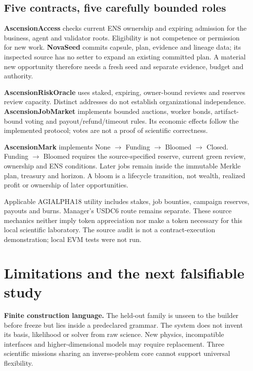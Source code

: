 \documentclass[11pt,letterpaper]{article}
\begin{document}
\subsection{Five contracts, five carefully bounded roles}

\textbf{AscensionAccess} checks current ENS ownership and expiring admission for the business, agent and validator roots. Eligibility is not competence or permission for new work. \textbf{NovaSeed} commits capsule, plan, evidence and lineage data; its inspected source has no setter to expand an existing committed plan. A material new opportunity therefore needs a fresh seed and separate evidence, budget and authority.

\textbf{AscensionRiskOracle} uses staked, expiring, owner-bound reviews and reserves review capacity. Distinct addresses do not establish organizational independence. \textbf{AscensionJobMarket} implements bounded auctions, worker bonds, artifact-bound voting and payout/refund/timeout rules. Its economic effects follow the implemented protocol; votes are not a proof of scientific correctness.

\textbf{AscensionMark} implements None $\to$ Funding $\to$ Bloomed $\to$ Closed. Funding $\to$ Bloomed requires the source-specified reserve, current green review, ownership and ENS conditions. Later jobs remain inside the immutable Merkle plan, treasury and horizon. A bloom is a lifecycle transition, not wealth, realized profit or ownership of later opportunities.

Applicable AGIALPHA18 utility includes stakes, job bounties, campaign reserves, payouts and burns. Manager's USDC6 route remains separate. These source mechanics neither imply token appreciation nor make a token necessary for this local scientific laboratory. The source audit is not a contract-execution demonstration; local EVM tests were not run.

\section{Limitations and the next falsifiable study}

\textbf{Finite construction language.} The held-out family is unseen to the builder before freeze but lies inside a predeclared grammar. The system does not invent its basis, likelihood or solver from raw science. New physics, incompatible interfaces and higher-dimensional models may require replacement. Three scientific missions sharing an inverse-problem core cannot support universal flexibility.
\end{document}
